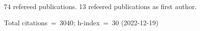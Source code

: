 74 refereed publications. 13 refeered publications as first author.

Total citations~=~3040; h-index~=~30 (2022-12-19)